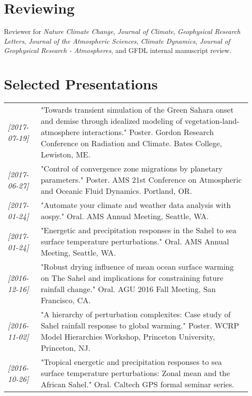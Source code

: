 \documentclass[12pt,letterpaper]{shillcv}
\begin{document}
\section*{Reviewing}
\label{sec:orgc439331}
Reviewer for \emph{Nature Climate Change}, \emph{Journal of Climate}, \emph{Geophysical Research
Letters}, \emph{Journal of the Atmospheric Sciences}, \emph{Climate Dynamics}, \emph{Journal of
Geophysical Research - Atmospheres}, and GFDL internal manuscript review.
\section*{Selected Presentations}
\label{sec:org29c2140}
\begin{center}
\begin{tabularx}{\textwidth}{lX}
\textit{[2017-07-19]} & "Towards transient simulation of the Green Sahara onset and demise through idealized modeling of vegetation-land-atmosphere interactions."  Poster.  Gordon Research Conference on Radiation and Climate.  Bates College, Lewiston, ME.\\
\textit{[2017-06-27]} & "Control of convergence zone migrations by planetary parameters."  Poster.  AMS 21st Conference on Atmospheric and Oceanic Fluid Dynamics.  Portland, OR.\\
\textit{[2017-01-24]} & "Automate your climate and weather data analysis with aospy."  Oral.  AMS Annual Meeting, Seattle, WA.\\
\textit{[2017-01-24]} & "Energetic and precipitation responses in the Sahel to sea surface temperature perturbations."  Oral.  AMS Annual Meeting, Seattle, WA.\\
\textit{[2016-12-16]} & "Robust drying influence of mean ocean surface warming on The Sahel and implications for constraining future rainfall change."  Oral.  AGU 2016 Fall Meeting, San Francisco, CA.\\
\textit{[2016-11-02]} & "A hierarchy of perturbation complexites: Case study of Sahel rainfall response to global warming."  Poster.  WCRP Model Hierarchies Workshop, Princeton University, Princeton, NJ.\\
\textit{[2016-10-26]} & "Tropical energetic and precipitation responses to sea surface temperature perturbations: Zonal mean and the African Sahel."  Oral.  Caltech GPS formal seminar series.\\
\end{tabularx}
\end{center}
\end{document}
